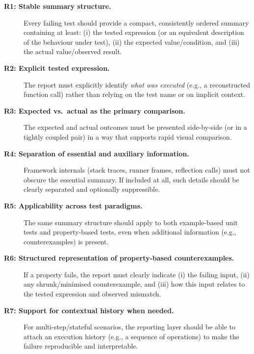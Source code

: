 \begin{description}
	\item[\textbf{R1: Stable summary structure.}]
		\begin{justify}
			Every failing test should provide a compact, consistently ordered summary containing at
            least: (i) the tested expression (or an equivalent description of the behaviour under
            test), (ii) the expected value/condition, and (iii) the actual value/observed result.
		\end{justify}
	\item[\textbf{R2: Explicit tested expression.}]
		\begin{justify}
			The report must explicitly identify \emph{what was executed} (e.g., a reconstructed
            function call) rather than relying on the test name or on implicit context.
		\end{justify}

	\item[\textbf{R3: Expected vs.\ actual as the primary comparison.}]
		\begin{justify}
			The expected and actual outcomes must be presented side-by-side (or in a tightly coupled
            pair) in a way that supports rapid visual comparison.
		\end{justify}

	\item[\textbf{R4: Separation of essential and auxiliary information.}]
		\begin{justify}
			Framework internals (stack traces, runner frames, reflection calls) must not obscure the
            essential summary. If included at all, such details should be clearly separated and
            optionally suppressible.
		\end{justify}

	\item[\textbf{R5: Applicability across test paradigms.}]
		\begin{justify}
			The same summary structure should apply to both example-based unit tests and
            property-based tests, even when additional information (e.g., counterexamples) is
            present.
		\end{justify}

	\item[\textbf{R6: Structured representation of property-based counterexamples.}]
		\begin{justify}
			If a property fails, the report must clearly indicate (i) the failing input, (ii) any
            shrunk/minimised counterexample, and (iii) how this input relates to the tested
            expression and observed mismatch.
		\end{justify}

	\item[\textbf{R7: Support for contextual history when needed.}]
		\begin{justify}
			For multi-step/stateful scenarios, the reporting layer should be able to attach an
            execution history (e.g., a sequence of operations) to make the failure reproducible and
            interpretable.
		\end{justify}
\end{description}


